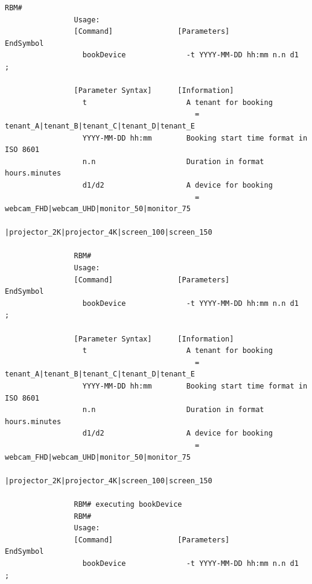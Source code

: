\documentclass{article}
\begin{document}
\begin{Verbatim}[gobble=8]
                RBM# 
                Usage: 
                [Command]               [Parameters]                            EndSymbol     
                  bookDevice              -t YYYY-MM-DD hh:mm n.n d1              ;           
                
                [Parameter Syntax]      [Information]                                         
                  t                       A tenant for booking                                
                                            = tenant_A|tenant_B|tenant_C|tenant_D|tenant_E    
                  YYYY-MM-DD hh:mm        Booking start time format in ISO 8601               
                  n.n                     Duration in format hours.minutes                    
                  d1/d2                   A device for booking                                
                                            = webcam_FHD|webcam_UHD|monitor_50|monitor_75     
                                              |projector_2K|projector_4K|screen_100|screen_150
                
                RBM#
                Usage: 
                [Command]               [Parameters]                            EndSymbol     
                  bookDevice              -t YYYY-MM-DD hh:mm n.n d1              ;           
                
                [Parameter Syntax]      [Information]                                         
                  t                       A tenant for booking                                
                                            = tenant_A|tenant_B|tenant_C|tenant_D|tenant_E    
                  YYYY-MM-DD hh:mm        Booking start time format in ISO 8601               
                  n.n                     Duration in format hours.minutes                    
                  d1/d2                   A device for booking                                
                                            = webcam_FHD|webcam_UHD|monitor_50|monitor_75     
                                              |projector_2K|projector_4K|screen_100|screen_150
                
                RBM# executing bookDevice
                RBM# 
                Usage: 
                [Command]               [Parameters]                            EndSymbol     
                  bookDevice              -t YYYY-MM-DD hh:mm n.n d1              ;           
                

\end{Verbatim}
\end{document}
